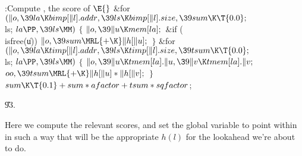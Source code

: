 \B{}:Compute , the score of \X${}\E{}$\6
\&{for} ${}(\|o,\39\\{la}\K\\{bimp}[\|l].\\{addr},\39\\{ls}\K\\{bimp}[\|l].%
\\{size},\39\\{sum}\K\T{0.0};{}$ \\{ls}; ${}\\{la}\PP,\39\\{ls}\MM){}$\5
${}\{{}$\1\6
${}\|o,\39\|u\K\\{mem}[\\{la}];{}$\6
\&{if} (\\{isfree}(\|u))\1\5
${}\|o,\39\\{sum}\MRL{+{\K}}\|h[\|u];{}$\2\6
\4${}\}{}$\2\6
\&{for} ${}(\|o,\39\\{la}\K\\{timp}[\|l].\\{addr},\39\\{ls}\K\\{timp}[\|l].%
\\{size},\39\\{tsum}\K\T{0.0};{}$ \\{ls}; ${}\\{la}\PP,\39\\{ls}\MM){}$\5
${}\{{}$\1\6
${}\|o,\39\|u\K\\{tmem}[\\{la}].\|u,\39\|v\K\\{tmem}[\\{la}].\|v;{}$\6
${}\\{oo},\39\\{tsum}\MRL{+{\K}}\|h[\|u]*\|h[\|v];{}$\6
\4${}\}{}$\2\6
${}\\{sum}\K\T{0.1}+\\{sum}*\\{afactor}+\\{tsum}*\\{sqfactor}{}$;\par
\U93.\fi

Here we compute the relevant scores, and set the global variable 
to point within  in such a way that  will be the
appropriate $h(l)$ for the lookahead we're about to do.


